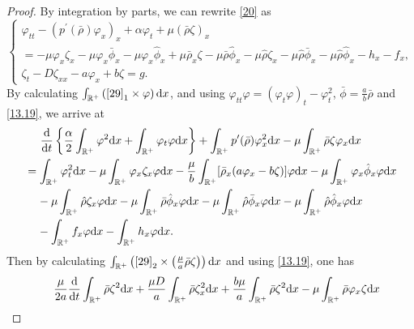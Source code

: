 \documentclass[11pt]{article}
\theoremstyle{plain}
\numberwithin{equation}{section}
\begin{document}
	\begin{proof}
		By integration by parts, we can rewrite \eqref{20} as 
		\begin{equation}\label{29}
			\left\{
			\begin{array}{lr}
				\varphi_{tt}-(p^{\prime}(\bar\rho)\varphi_x)_x+\alpha \varphi_t+\mu(\bar\rho\zeta)_x\\[2mm]
				=-\mu \varphi_x\zeta_x-\mu \varphi_x\bar\phi_x-\mu \varphi_x\hat\phi_x+\mu\bar\rho_x\zeta-\mu\bar\rho\hat\phi_x-\mu\hat\rho\zeta_x-\mu\hat\rho\bar\phi_x-\mu\hat\rho\hat\phi_x-h_x-f_x,\\[2mm]
				\zeta_t-D\zeta_{xx}-a\varphi_x+b\zeta=g.
			\end{array}
			\right.
		\end{equation}
		By calculating $\int_{\mathbb{R}^+}\left(\eqref{29}_1\times\varphi\right){\rm d}x$, and using $\varphi_{tt}\varphi=(\varphi_t\varphi)_t-\varphi_t^2$, $\bar\phi=\frac{a}{b}\bar\rho$ and \eqref{13.19},  we arrive at
\begin{align}\label{31}
			&\;\;\;\;\;	\frac{{\rm d}}{{\rm d}t}\left\{\frac{\alpha}{2}\int_{\mathbb{R}^+}\varphi^2{\rm d}x+\int_{\mathbb{R}^+}^{}\varphi_t\varphi {\rm d}x\right\}+\int_{\mathbb{R}^+}^{}p^{\prime}(\bar\rho)\varphi_x^2 {\rm d}x-\mu\int_{\mathbb{R}^+}^{}\bar\rho\zeta\varphi_x {\rm d}x\notag\\
			&=\int_{\mathbb{R}^+}\varphi_t^2{\rm d}x-\mu\int_{\mathbb{R}^+}^{}\varphi_x\zeta_x\varphi {\rm d}x-\frac{\mu}{b}\int_{\mathbb{R}^+}^{}[\bar\rho_x(a\varphi_x-b\zeta)]\varphi{\rm d}x-\mu\int_{\mathbb{R}^+}^{}\varphi_x\hat\phi_x\varphi{\rm d}x\notag\\
			&\;\;\;\;-\mu\int_{\mathbb{R}^+}^{}\hat\rho\zeta_x\varphi{\rm d}x	-\mu\int_{\mathbb{R}^+}^{}\bar\rho\hat\phi_x\varphi{\rm d}x-\mu\int_{\mathbb{R}^+}\hat\rho\bar\phi_x\varphi{\rm d}x	-\mu\int_{\mathbb{R}^+}\hat\rho\hat\phi_x\varphi{\rm d}x\notag\\
			&\;\;\;\;
		-\int_{\mathbb{R}^+}^{}f_x\varphi{\rm d}x-\int_{\mathbb{R}^+}h_x\varphi{\rm d}x.
		\end{align}
		Then by calculating $\int_{\mathbb{R}^+}\left(\eqref{29}_2\times\left(\frac{\mu}{a}\bar\rho\zeta\right)\right){\rm d}x$ and using \eqref{13.19}, one has
		\begin{align}\label{32}
			&\;\;\;\;\frac{\mu}{2a}	\frac{{\rm d}}{{\rm d}t}\int_{\mathbb{R}^+}^{}\bar\rho\zeta^2{\rm d}x+\frac{\mu D}{a}\int_{\mathbb{R}^+}^{}\bar\rho\zeta_x^2{\rm d}x+\frac{b\mu}{a}\int_{\mathbb{R}^+}^{}\bar\rho\zeta^2{\rm d}x-\mu\int_{\mathbb{R}^+}^{}\bar\rho\varphi_x\zeta {\rm d}x\notag\\

\end{align}
\end{proof}
\end{document}
